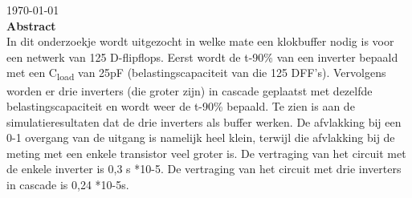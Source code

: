 \documentclass[12pt]{article}
\newcommand{\tss}{\textsubscript}
\begin{document}
\begin{titlepage}


{\large \today}\\[3cm] %


 
% 

\textbf{Abstract} \\
In dit onderzoekje wordt uitgezocht in welke mate een klokbuffer nodig is voor een netwerk van 125 D-flipflops. Eerst wordt de t-90\% van een inverter bepaald met een C\tss{load} van 25pF (belastingscapaciteit van die 125 DFF's). Vervolgens worden er drie inverters (die groter zijn)  in cascade geplaatst met dezelfde belastingscapaciteit en wordt weer de t-90\% bepaald. Te zien is aan de simulatieresultaten dat de drie inverters als buffer werken. De afvlakking bij een 0-1 overgang van de uitgang is namelijk heel klein, terwijl die afvlakking bij de meting met een enkele transistor veel groter is. De vertraging van het circuit met de enkele inverter is 0,3 s *10-5. De vertraging van het circuit met drie inverters in cascade is 0,24  *10-5s. 

\vfill %

\end{titlepage}
\end{document}
